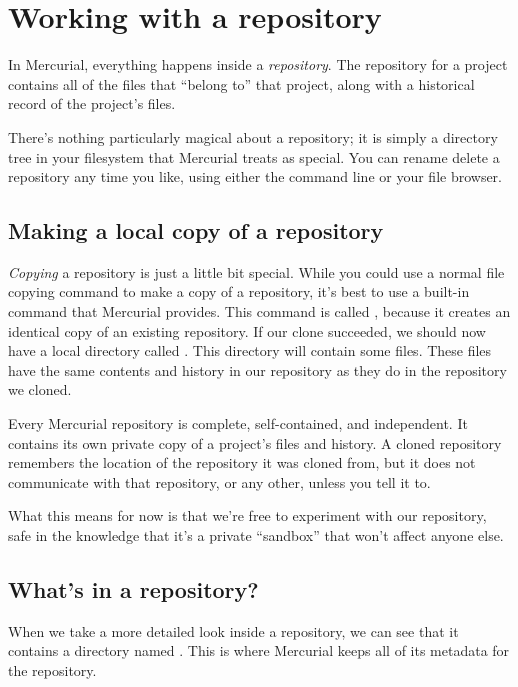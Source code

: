\section{Working with a repository}

In Mercurial, everything happens inside a \emph{repository}.  The
repository for a project contains all of the files that ``belong to''
that project, along with a historical record of the project's files.

There's nothing particularly magical about a repository; it is simply
a directory tree in your filesystem that Mercurial treats as special.
You can rename delete a repository any time you like, using either the
command line or your file browser.

\subsection{Making a local copy of a repository}

\emph{Copying} a repository is just a little bit special.  While you
could use a normal file copying command to make a copy of a
repository, it's best to use a built-in command that Mercurial
provides.  This command is called , because it creates an
identical copy of an existing repository.
If our clone succeeded, we should now have a local directory called
.  This directory will contain some files.
These files have the same contents and history in our repository as
they do in the repository we cloned.

Every Mercurial repository is complete, self-contained, and
independent.  It contains its own private copy of a project's files
and history.  A cloned repository remembers the location of the
repository it was cloned from, but it does not communicate with that
repository, or any other, unless you tell it to.

What this means for now is that we're free to experiment with our
repository, safe in the knowledge that it's a private ``sandbox'' that
won't affect anyone else.

\subsection{What's in a repository?}

When we take a more detailed look inside a repository, we can see that
it contains a directory named .  This is where Mercurial
keeps all of its metadata for the repository.

